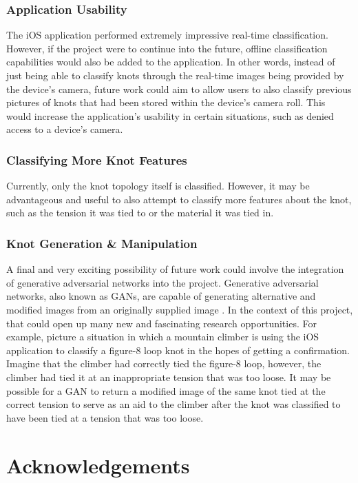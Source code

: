\documentclass{l4proj}
\begin{document}
\subsubsection{Application Usability}
The iOS application performed extremely impressive real-time classification. However, if the project were to continue into the future, offline classification capabilities would also be added to the application. In other words, instead of just being able to classify knots through the real-time images being provided by the device's camera, future work could aim to allow users to also classify previous pictures of knots that had been stored within the device's camera roll. This would increase the application's usability in certain situations, such as denied access to a device's camera.

\subsubsection{Classifying More Knot Features}
Currently, only the knot topology itself is classified. However, it may be advantageous and useful to also attempt to classify more features about the knot, such as the tension it was tied to or the material it was tied in.

\subsubsection{Knot Generation \& Manipulation}
A final and very exciting possibility of future work could involve the integration of generative adversarial networks into the project.
Generative adversarial networks, also known as GANs, are capable of generating alternative and modified images from an originally supplied image \cite{Goodfellow:2014:GAN:2969033.2969125}.
In the context of this project, that could open up many new and fascinating research opportunities.
For example, picture a situation in which a mountain climber is using the iOS application to classify a figure-8 loop knot in the hopes of getting a confirmation. 
Imagine that the climber had correctly tied the figure-8 loop, however, the climber had tied it at an inappropriate tension that was too loose.
It may be possible for a GAN to return a modified image of the same knot tied at the correct tension to serve as an aid to the climber after the knot was classified to have been tied at a tension that was too loose.

\section{Acknowledgements}
\end{document}
